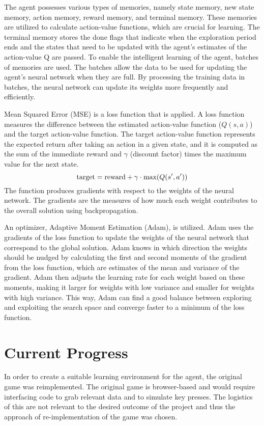 \documentclass[letterpaper]{article} %
\begin{document}
\par The agent possesses various types of memories, namely state memory, new state memory, action memory, reward memory, and terminal memory. These memories are utilized to calculate action-value functions, which are crucial for learning. The terminal memory stores the done flags that indicate when the exploration period ends and the states that need to be updated with the agent's estimates of the action-value Q are passed. To enable the intelligent learning of the agent, batches of memories are used. The batches allow the data to be used for updating the agent's neural network when they are full. By processing the training data in batches, the neural network can update its weights more frequently and efficiently.

\par Mean Squared Error (MSE) is a loss function that is applied. A loss function measures the difference between the estimated action-value function ($Q(s, a)$) and the target action-value function. The target action-value function represents the expected return after taking an action in a given state, and it is computed as the sum of the immediate reward and $\gamma$ (discount factor) times the maximum value for the next state.
$$
\textnormal{target} = \textnormal{reward} + \gamma \cdot \textnormal{max}(Q(s', a'))
$$
The function produces gradients with respect to the weights of the neural network. The gradients are the measures of how much each weight contributes to the overall solution using backpropagation.

\par An optimizer, Adaptive Moment Estimation (Adam), is utilized. Adam uses the gradients of the loss function to update the weights of the neural network that correspond to the global solution. Adam knows in which direction the weights should be nudged by calculating the first and second moments of the gradient from the loss function, which are estimates of the mean and variance of the gradient. Adam then adjusts the learning rate for each weight based on these moments, making it larger for weights with low variance and smaller for weights with high variance. This way, Adam can find a good balance between exploring and exploiting the search space and converge faster to a minimum of the loss function.

\section{Current Progress}
In order to create a suitable learning environment for the agent, the original game was reimplemented. The original game is browser-based and would require interfacing code to grab relevant data and to simulate key presses. The logistics of this are not relevant to the desired outcome of the project and thus the approach of re-implementation of the game was chosen.
\end{document}
